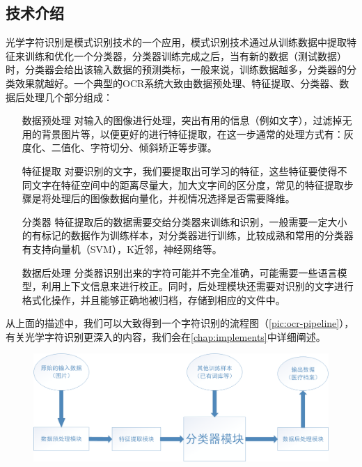 \subsection{技术介绍}
光学字符识别是模式识别技术的一个应用，模式识别技术通过从训练数据中提取特征来训练和优化一个分类器，分类器训练完成之后，当有新的数据（测试数据）时，分类器会给出该输入数据的预测类标，一般来说，训练数据越多，分类器的分类效果就越好。一个典型的OCR系统大致由数据预处理、特征提取、分类器、数据后处理几个部分组成：
\begin{itemize}
	\item[数据预处理] 对输入的图像进行处理，突出有用的信息（例如文字），过滤掉无用的背景图片等，以便更好的进行特征提取，在这一步通常的处理方式有：灰度化、二值化、字符切分、倾斜矫正等步骤。
	\item[特征提取] 对要识别的文字，我们要提取出可学习的特征，这些特征要使得不同文字在特征空间中的距离尽量大，加大文字间的区分度，常见的特征提取步骤是将处理后的图像数据向量化，并视情况选择是否需要降维。
	\item[分类器] 特征提取后的数据需要交给分类器来训练和识别，一般需要一定大小的有标记的数据作为训练样本，对分类器进行训练，比较成熟和常用的分类器有支持向量机（SVM），K近邻，神经网络等。
	\item[数据后处理] 分类器识别出来的字符可能并不完全准确，可能需要一些语言模型，利用上下文信息来进行校正。同时，后处理模块还需要对识别的文字进行格式化操作，并且能够正确地被归档，存储到相应的文件中。
\end{itemize}
从上面的描述中，我们可以大致得到一个字符识别的流程图（\autoref{pic:ocr-pipeline}），有关光学字符识别更深入的内容，我们会在\autoref{chap:implements}中详细阐述。

\begin{figure}
\centering
  \includegraphics[scale=0.3]{figures/ocr-pipeline}
  \label{pic:ocr-pipeline}
\end{figure}

